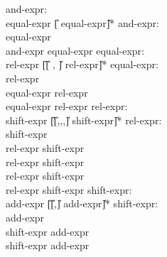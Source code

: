 \begin{center}
\PAIR
{
and-expr:\\
\>	equal-expr \U{[}\T{\&} equal-expr\U{]}*
}
{
and-expr:\\
\>	equal-expr\\
\>	and-expr \T{\&} equal-expr
}
\PAIR
{
equal-expr:\\
\>	rel-expr \U{[}\U{[}\T{==} , \T{!=}\U{]} rel-expr\U{]}*
}
{
equal-expr:\\
\>	rel-expr\\
\>	equal-expr \T{==} rel-expr\\
\>	equal-expr \T{!=} rel-expr
}
\PAIR
{
rel-expr:\\
\>         shift-expr \U{[}\U{[}\T{>},\T{<},\T{<=},\T{>=}\U{]} shift-expr\U{]}*
}
{
rel-expr:\\
\>	shift-expr\\
\>	rel-expr \T{<} shift-expr\\
\>	rel-expr \T{>} shift-expr\\
\>	rel-expr \T{<=} shift-expr\\
\>	rel-expr \T{>=} shift-expr
}
\PAIR
{
shift-expr: \\
\>	add-expr \U{[}\U{[}\T{<<},\T{>>}\U{]} add-expr\U{]}*
}
{
shift-expr: \\
\>	add-expr\\
\>	shift-expr \T{<<} add-expr\\
\>	shift-expr \T{>>} add-expr
}


\end{center}
